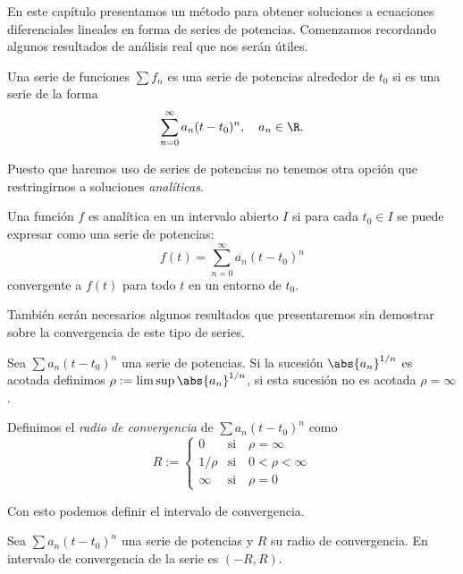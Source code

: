 \documentclass[../ecuaciones_diferenciales.tex]{subfiles}
\begin{document}
En este capítulo presentamos un método para obtener soluciones a ecuaciones
diferenciales lineales en forma de series de potencias. Comenzamos recordando
algunos resultados de análisis real que nos serán útiles.

\begin{definition}
	Una serie de funciones \(\sum f_n\) es una serie de potencias alrededor de
	\(t_0\) si es una serie de la forma
	\[\sum_{n = 0}^\infty a_n (t - t_0)^n, \quad a_n \in \R.\]
\end{definition}

Puesto que haremos uso de series de potencias no tenemos otra opción 
que restringirnos a soluciones \emph{analíticas}.

\begin{definition}
	Una función \(f\) es analítica en un intervalo abierto \(I\) si para cada
	\(t_0 \in I\) se puede expresar como una serie de potencias:
	\[f(t) = \sum_{n = 0}^\infty a_n (t - t_0)^n\]
	convergente a \(f(t)\) para todo \(t\) en un entorno de \(t_0\).
\end{definition}

También serán necesarios algunos resultados que presentaremos sin demostrar
sobre la convergencia de este tipo de series.

\begin{definition}
	Sea \(\sum a_n (t - t_0)^n\) una serie de potencias. Si la sucesión 
	\(\abs{a_n}^{1/n}\) es acotada definimos 
	\(\rho := \lim\sup\abs{a_n}^{1/n}\), si esta sucesión no es acotada 
	\(\rho = \infty\). 

	Definimos el \emph{radio de convergencia} de \(\sum a_n (t - t_0)^n\) como
	\[R := 
		\begin{cases}
			0 & \text{si} \quad \rho = \infty \\
			1/\rho & \text{si} \quad 0 < \rho < \infty \\
			\infty & \text{si} \quad \rho = 0
		\end{cases}
	\]
\end{definition}

Con esto podemos definir el intervalo de convergencia.

\begin{definition}
	Sea \(\sum a_n (t - t_0)^n\) una serie de potencias y \(R\) su radio de
	convergencia. En intervalo de convergencia de la serie es \((-R, R)\).
\end{definition}
\end{document}
